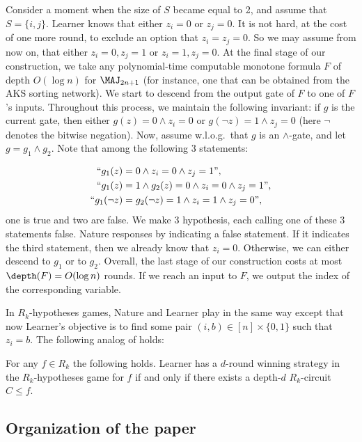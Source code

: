 Consider a moment when the size of $S$ became equal to 2, and assume that $S = \{i,j\}$. Learner knows that either $z_i = 0$ or $z_j = 0$.
It is not hard, at the cost of one more round, to exclude an option that $z_i = z_j = 0$. So we may assume from now on, that either $z_i = 0, z_j = 1$ or $z_i = 1, z_j = 0$.
At the final stage of our construction, we take any 
polynomial-time %
computable %
monotone formula $F$ of depth $O(\log n)$  %
for $\MAJ_{2n + 1}$ (for instance, one that can be obtained from the AKS sorting network). We start to descend  from the output gate of $F$ to one of $F$'s inputs. Throughout this process, we maintain the following invariant:  if $g$ is the current gate, then either $g(z) = 0 \land z_i = 0$ or $g(\lnot z) = 1 \land z_j = 0$ (here $\lnot$ denotes the %
bitwise  %
negation). Now, assume w.l.o.g.~that $g$ is an $\land$-gate, and let $g = g_1\land g_2$. Note that among the following 3 statements:

\begin{align*}
``g_1(z) &= 0\land z_i = 0 \land z_j = 1\mbox{''}, \\
``g_1(z) &= 1 \land g_2(z) = 0\land z_i = 0 \land z_j = 1\mbox{''}, \\
``g_1(\lnot z) &= g_2(\lnot z) = 1 \land z_i = 1 \land z_j = 0\mbox{''}, \\
\end{align*}
one is true and two are false. We make 3 hypothesis, each calling one of these 3 statements false. Nature responses by indicating a false statement. If it indicates the third statement, then we already know that $z_i = 0$. Otherwise, we can either descend to $g_1$ or to $g_2$. Overall, the last stage of our construction costs at most $\depth(F) = O(\log n)$ rounds. If we reach an input to $F$, we output the index of the corresponding variable. 

\medskip

In $R_k$-hypotheses games, Nature and Learner play in the same way except that now Learner's objective is to find some pair $(i, b) \in [n] \times \{0, 1\}$ such that $z_i =b$.  The following analog of  holds:
\begin{proposition}
\label{games_R_k}
For any $f\in R_k$ the following holds. Learner has a $d$-round winning strategy in the $R_k$-hypotheses game for $f$ if and only if there exists a
depth-$d$ $R_k$-circuit $C\le f$.
\end{proposition}

\subsection{Organization of the paper}

